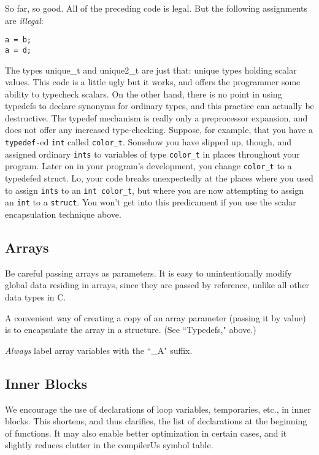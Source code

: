 So far, so good.  All of the preceding code is legal.  But the
following assignments are {\em illegal}:
\begin{verbatim}
a = b;
a = d;
\end{verbatim}
The types unique\_t and unique2\_t are just that: unique types holding
scalar values.  This code is a little ugly but it works, and offers
the programmer some ability to typecheck scalars.  On the other hand,
there is no point in using typedefs to declare synonyms for ordinary
types, and this practice can actually be destructive.  The typedef
mechanism is really only a preprocessor expansion, and does not offer
any increased type-checking.  Suppose, for example, that you have a
{\tt typedef-}ed {\tt int} called {\tt color\_t}.  Somehow you have
slipped up, though, and assigned ordinary {\tt ints} to variables of
type {\tt color\_t} in places throughout your program.  Later on in
your program's development, you change {\tt color\_t} to a typedefed
struct.  Lo, your code breaks unexpectedly at the places where you
used to assign {\tt ints} to an {\tt int color\_t}, but where you are
now attempting to assign an {\tt int} to a {\tt struct}.  You won't
get into this predicament if you use the scalar encapsulation
technique above.

\subsection{Arrays}

Be careful passing arrays as parameters.  It is easy to
unintentionally modify global data residing in arrays, since they are
passed by reference, unlike all other data types in C.

A convenient way of creating a copy of an array parameter (passing it
by value) is to encapsulate the array in a structure.  (See
``Typedefs," above.)

{\em Always} label array variables with the ``\_A" suffix.

\subsection{Inner Blocks}

We encourage the use of declarations of loop variables, temporaries,
etc., in inner blocks.  This shortens, and thus clarifies, the list of
declarations at the beginning of functions.  It may also enable better
optimization in certain cases, and it slightly reduces clutter in the
compilerUs symbol table.

